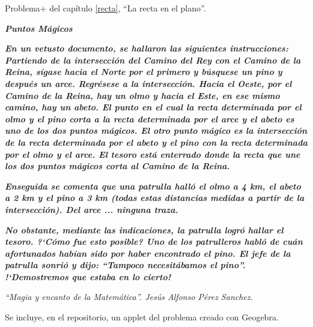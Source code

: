 Problema+ del capítulo \ref{recta}, ``La recta en el plano''.

\vspace{5mm}

\textbf{\emph{Puntos Mágicos}}
\vspace{5mm}
\begin{destacado} 
\begin{adjustwidth}{20pt}{20pt}
\vspace{2mm}
\color{NavyBlue}
\vspace{2mm} \textbf{\emph{En un vetusto documento, se hallaron las siguientes instrucciones: Partiendo de la intersección del Camino del Rey con el Camino de la Reina, sígase hacia el Norte por el primero y búsquese un pino y después un arce. Regrésese a la intersección. Hacia el Oeste, por el Camino de la Reina, hay un olmo y hacia el Este, en ese mismo camino, hay un abeto. El punto en el cual la recta determinada por el olmo y el pino corta a la recta determinada por el arce y el abeto es uno de los dos puntos mágicos. El otro punto mágico es la intersección de la recta determinada por el abeto y el pino con la recta determinada por el olmo y el arce. El tesoro está enterrado donde la recta que une los dos puntos mágicos corta al Camino de la Reina.}}

\vspace{2mm} \textbf{\emph{Enseguida se comenta que una patrulla halló el olmo a 4 km, el abeto a 2 km y el pino a 3 km (todas estas distancias medidas a partir de la intersección). Del arce ... ninguna traza.}}

\vspace{2mm} \textbf{\emph{No obstante, mediante las indicaciones, la patrulla logró hallar el tesoro. ?`Cómo fue esto posible? Uno de los patrulleros habló de cuán afortunados habían sido por haber encontrado el pino. El jefe de la patrulla sonrió y dijo: ``Tampoco necesitábamos el pino''. !`Demostremos que estaba en lo cierto! }}
\color{Black}
\vspace{2mm}
\end{adjustwidth}
\end{destacado}

\vspace{4mm} \begin{flushright} \emph{ ``Magia y encanto de la Matemática''. Jesús Alfonso Pérez Sanchez. } \end{flushright}

\begin{flushright}
\textsf{Se incluye, en el repositorio, un applet del problema creado con Geogebra.}	
\end{flushright}



